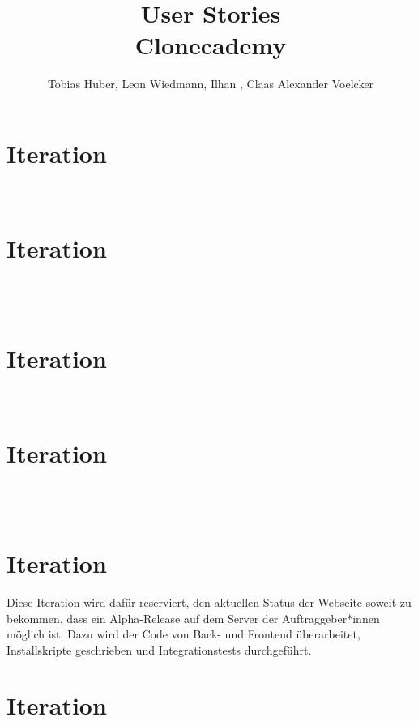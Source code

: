 \documentclass
[english,accentcolor=tud1c]
{tudreport}
\title{User Stories\\Clonecademy}
\author{Tobias Huber, Leon Wiedmann, Ilhan , Claas Alexander Voelcker}
\begin{document}

	\maketitle

	\chapter{Iteration}

	 \\
	


	\chapter{Iteration}

	 \\
	 \\
	


	\chapter{Iteration}

	 \\
	


	\chapter{Iteration}

	\\
	\\
	
	
	\chapter{Iteration}
	
	Diese Iteration wird dafür reserviert, den aktuellen Status der Webseite soweit zu bekommen, dass ein Alpha-Release auf dem Server der Auftraggeber*innen möglich ist. Dazu wird der Code von Back- und Frontend überarbeitet, Installskripte geschrieben und Integrationstests durchgeführt.

	\chapter{Iteration}
\end{document}
